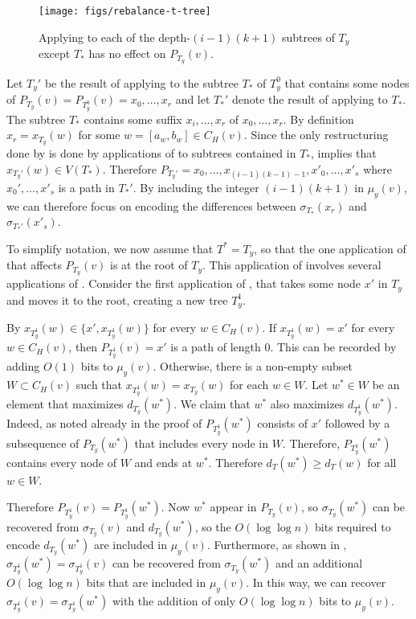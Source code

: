 \documentclass[kpfonts]{patmorin}
\begin{document}
\begin{figure}
  \begin{center}
    \texttt{[image: figs/rebalance-t-tree]}
  \end{center}
  \caption{Applying  to each of the depth-$(i-1)(k+1)$ subtrees of $T_y$ except $T_*$ has no effect on $P_{T_y}(v)$.}
\end{figure}

Let $T_y'$ be the result of applying  to the subtree $T_*$ of $T_y^0$ that contains some nodes of $P_{T_y}(v)=P_{T_y^0}(v)=x_0,\ldots,x_r$ and let $T_*'$ denote the result of applying  to $T_*$.
The subtree $T_*$ contains some suffix $x_i,\ldots,x_r$ of $x_0,\ldots,x_r$.  By definition $x_r=x_{T_y}(w)$ for some $w=[a_w,b_w]\in C_H(v)$.  Since the only restructuring done by  is done by applications of  to subtrees contained in $T_*$,   implies that $x_{T_y'}(w)\in V(T_*)$.  Therefore $P_{T_y'}=x_0,\ldots,x_{(i-1)(k-1)-1},x'_0,\ldots,x'_{s}$ where $x_0',\ldots,x'_s$ is a path in $T_*'$. By including the integer $(i-1)(k+1)$ in $\mu_y(v)$, we can therefore focus on encoding the differences between $\sigma_{T_*}(x_r)$ and $\sigma_{T_*'}(x'_s)$.

To simplify notation, we now assume that $T^*=T_y$, so that the one application of  that affects $P_{T_y}(v)$ is at the root of $T_y$.
This application of  involves several applications of .  Consider the first application of , that takes some node $x'$ in $T_y$ and moves it to the root, creating a new tree $T_y^1$.

By  $x_{T_y^1}(w)\in\{x',x_{T_y^1}(w)\}$ for every $w\in C_H(v)$.  If $x_{T_y^1}(w)=x'$ for every $w\in C_H(v)$, then $P_{T_y^1}(v)=x'$ is a path of length 0.  This can be recorded by adding $O(1)$ bits to $\mu_y(v)$. Otherwise, there is a non-empty subset $W\subset C_H(v)$ such that $x_{T_y^1}(w)=x_{T_y}(w)$ for each $w\in W$.  Let $w^*\in W$ be an element that maximizes $d_{T_y}(w^*)$.  We claim that $w^*$ also maximizes $d_{T_y^1}(w^*)$.  Indeed, as noted already in the proof of  $P_{T_y^1}(w^*)$ consists of $x'$ followed by a subsequence of $P_{T_y}(w^*)$ that includes every node in $W$.  Therefore, $P_{T_y^1}(w^*)$ contains every node of $W$ and ends at $w^*$.  Therefore $d_T(w^*)\ge d_T(w)$ for all $w\in W$.

Therefore $P_{T_y^1}(v)=P_{T_y^1}(w^*)$.  Now $w^*$ appear in $P_{T_y}(v)$, so $\sigma_{T_y}(w^*)$ can be recovered from $\sigma_{T_y}(v)$ and $d_{T_y}(w^*)$, so the $O(\log\log n)$ bits required to encode $d_{T_y}(w^*)$ are included in $\mu_y(v)$.  Furthermore, as shown in , $\sigma_{T_y^1}(w^*)=\sigma_{T_y^1}(v)$ can be recovered from $\sigma_{T_y}(w^*)$ and an additional $O(\log\log n)$ bits that are included in $\mu_y(v)$.  In this way, we can recover $\sigma_{T_y^1}(v)=\sigma_{T_y^1}(w^*)$ with the addition of only $O(\log\log n)$ bits to $\mu_y(v)$.
\end{document}
